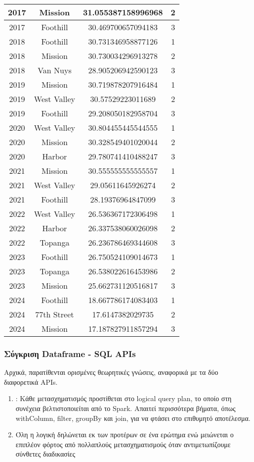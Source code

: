 \documentclass{article}
\begin{document}
\begin{table}[h!]
\begin{tabular}{|c|c|c|c|}
2017 & Mission & 31.055387158996968 & 2 \\ \hline
2017 & Foothill & 30.469700657094183 & 3 \\ \hline
2018 & Foothill & 30.731346958877126 & 1 \\ \hline
2018 & Mission & 30.730034296913278 & 2 \\ \hline
2018 & Van Nuys & 28.905206942590123 & 3 \\ \hline
2019 & Mission & 30.719878207916484 & 1 \\ \hline
2019 & West Valley & 30.57529223011689 & 2 \\ \hline
2019 & Foothill & 29.208050182958704 & 3 \\ \hline
2020 & West Valley & 30.804455445544555 & 1 \\ \hline
2020 & Mission & 30.328549401020044 & 2 \\ \hline
2020 & Harbor & 29.780741410488247 & 3 \\ \hline
2021 & Mission & 30.555555555555557 & 1 \\ \hline
2021 & West Valley & 29.05611645926274 & 2 \\ \hline
2021 & Foothill & 28.19376964847099 & 3 \\ \hline
2022 & West Valley & 26.536367172306498 & 1 \\ \hline
2022 & Harbor & 26.337538060026098 & 2 \\ \hline
2022 & Topanga & 26.236786469344608 & 3 \\ \hline
2023 & Foothill & 26.750524109014673 & 1 \\ \hline
2023 & Topanga & 26.538022616453986 & 2 \\ \hline
2023 & Mission & 25.662731120516817 & 3 \\ \hline
2024 & Foothill & 18.667786174083403 & 1 \\ \hline
2024 & 77th Street & 17.6147382029735 & 2 \\ \hline
2024 & Mission & 17.187827911857294 & 3 \\ \hline
\end{tabular}
\end{table}

\subsubsection*{Σύγκριση Dataframe - SQL APIs}
Αρχικά, παρατίθενται ορισμένες θεωρητικές γνώσεις, αναφορικά με τα δύο διαφορετικά APIs. 
\begin{enumerate}
	\item : Κάθε μετασχηματισμός προστίθεται στο logical query plan, το οποίο
		στη συνέχεια βελτιστοποιείται από το Spark. Απαιτεί περισσότερα βήματα, όπως
		withColumn, filter, groupBy και join, για να φτάσει στο επιθυμητό αποτέλεσμα.
	\item Όλη η λογική δηλώνεται εκ των προτέρων σε ένα ερώτημα ενώ μειώνεται ο
		επιπλέον φόρτος από πολλαπλούς μετασχηματισμούς όταν αντιμετωπίζουμε
		σύνθετες διαδικασίες
\end{enumerate}
\end{document}
